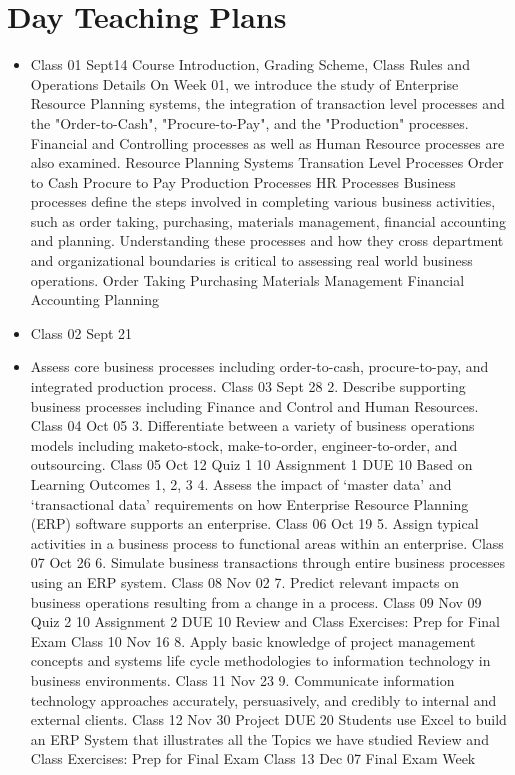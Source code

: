\section {Day Teaching Plans} 
\begin{itemize} 
\item Class 01 Sept14
      Course Introduction, Grading Scheme, Class Rules and Operations Details
      On Week 01, we introduce the study of Enterprise Resource Planning systems, the integration of transaction level processes and the "Order-to-Cash", "Procure-to-Pay", and the "Production" processes. Financial and Controlling processes as well as Human Resource processes are also examined. 
        Resource Planning Systems
        Transation Level Processes
        Order to Cash
        Procure to Pay
        Production Processes
        HR Processes
         Business processes define the steps involved in completing various business activities, such as order taking, purchasing, materials management, financial accounting and planning. Understanding these processes and how they cross department and organizational boundaries is critical to assessing real world business operations. 
          Order Taking
          Purchasing
          Materials Management
          Financial Accounting
          Planning
\item  Class 02 Sept 21 

 
      \item Assess core business processes including order-to-cash, procure-to-pay, and integrated production process.
    Class 03 Sept 28
      2.    Describe supporting business processes including Finance and Control and Human Resources.
    Class 04 Oct 05
      3.    Differentiate between a variety of business operations models including maketo-stock, make-to-order, engineer-to-order, and outsourcing.
    Class 05 Oct 12
      Quiz 1  10%
      Assignment 1 DUE  10%
        Based on Learning Outcomes 1, 2, 3
      4.    Assess the impact of ‘master data’ and ‘transactional data’ requirements on how Enterprise Resource Planning (ERP) software supports an enterprise.
    Class 06 Oct 19
      5.    Assign typical activities in a business process to functional areas within an enterprise.
    Class 07 Oct 26
      6.    Simulate business transactions through entire business processes using an ERP system.
    Class 08 Nov 02
      7.    Predict relevant impacts on business operations resulting from a change in a process.
    Class 09 Nov 09
      Quiz 2  10%
      Assignment 2 DUE 10%
      Review and Class Exercises: Prep for Final Exam
    Class 10 Nov 16
      8.    Apply basic knowledge of project management concepts and systems life cycle methodologies to information technology in business environments.
    Class 11 Nov 23
      9.    Communicate information technology approaches accurately, persuasively, and credibly to internal and external clients.
    Class 12 Nov 30
      Project  DUE     20%
        Students use Excel to build an ERP System that illustrates all the Topics we have studied
      Review and Class Exercises: Prep for Final Exam
    Class 13 Dec 07 Final Exam Week
    \end{itemize}
